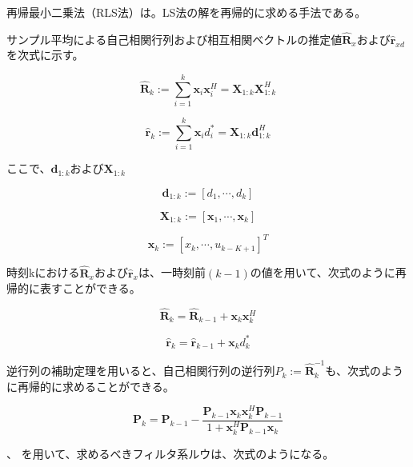 再帰最小二乗法（RLS法）は。LS法の解を再帰的に求める手法である。

サンプル平均による自己相関行列および相互相関ベクトルの推定値\(\hat{\bm{R}}_x\)および\(\hat{\bm{r}}_{xd}\)を次式に示す。

\begin{equation}
\hat{\bm{R}}_k := \sum_{i=1}^k \bm{x}_i \bm{x}_i^H = \bm{X}_{1:k} \bm{X}_{1:k}^H
\end{equation}

\begin{equation}
\hat{\bm{r}}_k := \sum_{i=1}^k \bm{x}_i d_i^* = \bm{X}_{1:k} \bm{d}_{1:k}^H
\end{equation}

ここで、\(\bm{d}_{1:k}\)および\(\bm{X}_{1:k}\)

\begin{equation}
\bm{d}_{1:k} := [d_1, \cdots, d_k]
\end{equation}

\begin{equation}
\bm{X}_{1:k} := [\bm{x}_1, \cdots, \bm{x}_k]
\end{equation}

\begin{equation}
\bm{x}_{k} := [x_k, \cdots, u_{k-K+1}]^T
\end{equation}

時刻kにおける\(\hat{\bm{R}}_x\)および\(\hat{\bm{r}}_x\)は、一時刻前\((k-1)\)の値を用いて、次式のように再帰的に表すことができる。


\begin{equation}
\hat{\bm{R}}_k = \hat{\bm{R}}_{k-1} + \bm{x}_k \bm{x}_k^H
\end{equation}


\begin{equation}
\hat{\bm{r}}_k = \hat{\bm{r}}_{k-1} + \bm{x}_k d_k^*
\label{equ:hat_r}
\end{equation}

逆行列の補助定理を用いると、自己相関行列の逆行列\(P_k := \hat{\bm{R}}_k^{-1}\)も、次式のように再帰的に求めることができる。


\begin{equation}
\bm{P}_k = \bm{P}_{k-1} - \frac{\bm{P}_{k-1} \bm{x}_k \bm{x}_k^H \bm{P}_{k-1}}{1 + \bm{x}_k^H \bm{P}_{k-1} \bm{x}_k} 
\label{equ:P_k_inv_R}
\end{equation}

、
を用いて、求めるべきフィルタ系ルウは、次式のようになる。

